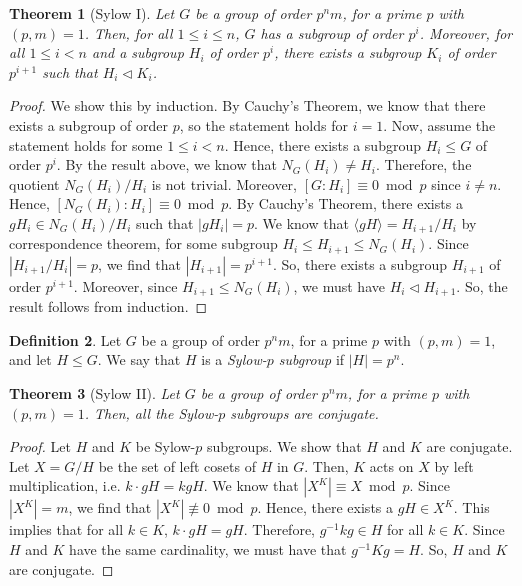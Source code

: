\documentclass[a4paper, openany]{memoir}
\theoremstyle{definition}
\newtheorem{definition}{Definition}[section]
\theoremstyle{plain}
\newtheorem{theorem}[definition]{Theorem}
\begin{document}
    \begin{theorem}[Sylow I]
        Let $G$ be a group of order $p^nm$, for a prime $p$ with $(p, m) = 1$. Then, for all $1 \leq i \leq n$, $G$ has a subgroup of order $p^i$. Moreover, for all $1 \leq i < n$ and a subgroup $H_i$ of order $p^i$, there exists a subgroup $K_i$ of order $p^{i+1}$ such that $H_i \vartriangleleft K_i$.
    \end{theorem}
    \begin{proof}
        We show this by induction. By Cauchy's Theorem, we know that there exists a subgroup of order $p$, so the statement holds for $i = 1$. Now, assume the statement holds for some $1 \leq i < n$. Hence, there exists a subgroup $H_i \leq G$ of order $p^i$. By the result above, we know that $N_G(H_i) \neq H_i$. Therefore, the quotient $N_G(H_i)/H_i$ is not trivial. Moreover, $[G:H_i] \equiv 0 \bmod{p}$ since $i \neq n$. Hence, $[N_G(H_i):H_i] \equiv 0 \bmod{p}$. By Cauchy's Theorem, there exists a $gH_i \in N_G(H_i)/H_i$ such that $|gH_i| = p$. We know that $\langle gH \rangle = H_{i+1}/H_i$ by correspondence theorem, for some subgroup $H_i \leq H_{i+1} \leq N_G(H_i)$. Since $|H_{i+1}/H_i| = p$, we find that $|H_{i+1}| = p^{i+1}$. So, there exists a subgroup $H_{i+1}$ of order $p^{i+1}$. Moreover, since $H_{i+1} \leq N_G(H_i)$, we must have $H_i \vartriangleleft H_{i+1}$. So, the result follows from induction.
    \end{proof}

    \begin{definition}
        Let $G$ be a group of order $p^nm$, for a prime $p$ with $(p, m) = 1$, and let $H \leq G$. We say that $H$ is a \emph{Sylow-$p$ subgroup} if $|H| = p^n$.
    \end{definition}

    \begin{theorem}[Sylow II]
        Let $G$ be a group of order $p^nm$, for a prime $p$ with $(p, m) = 1$. Then, all the Sylow-$p$ subgroups are conjugate.
    \end{theorem}
    \begin{proof}
        Let $H$ and $K$ be Sylow-$p$ subgroups. We show that $H$ and $K$ are conjugate. Let $X = G/H$ be the set of left cosets of $H$ in $G$. Then, $K$ acts on $X$ by left multiplication, i.e. $k \cdot gH = kgH$. We know that $|X^K| \equiv X \bmod{p}$. Since $|X^K| = m$, we find that $|X^K| \not\equiv 0 \bmod{p}$. Hence, there exists a $gH \in X^K$. This implies that for all $k \in K$, $k \cdot gH = gH$. Therefore, $g^{-1}kg \in H$ for all $k \in K$. Since $H$ and $K$ have the same cardinality, we must have that $g^{-1}Kg = H$. So, $H$ and $K$ are conjugate.
    \end{proof}
\end{document}
